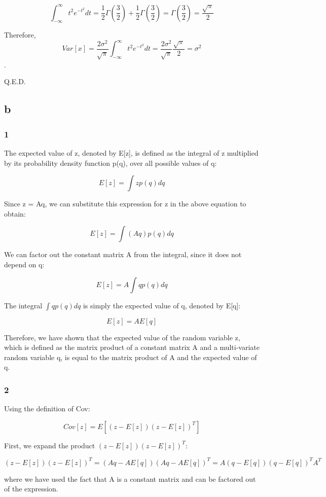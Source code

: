 $$\int_{-\infty}^{\infty} t^2 e^{-t^2} dt=\frac{1}{2}\Gamma\left(\frac{3}{2}\right)+\frac{1}{2}\Gamma\left(\frac{3}{2}\right)=\Gamma\left(\frac{3}{2}\right)=\frac{\sqrt{\pi}}{2}$$

Therefore,
$$Var[x] = \frac{2\sigma^2}{\sqrt{\pi}} \int_{-\infty}^{\infty} t^2 e^{-t^2} dt=\frac{2\sigma^2}{\sqrt{\pi}}\frac{\sqrt{\pi}}{2}=\sigma^2$$.

Q.E.D.

\subsection{b}
\subsubsection{1}

The expected value of z, denoted by E[z], is defined as the integral of z multiplied by its probability density function p(q), over all possible values of q:

$$E[z] = \int z p(q) dq  $$


Since z = Aq, we can substitute this expression for z in the above equation to obtain:

$$E[z] = \int (Aq) p(q) dq$$

We can factor out the constant matrix A from the integral, since it does not depend on q:

$$E[z] = A \int q p(q) dq $$

The integral $\int q p(q) dq$ is simply the expected value of q, denoted by E[q]:

$$E[z] = AE[q]$$

Therefore, we have shown that the expected value of the random variable z, which is defined as the matrix product of a constant matrix A and a multi-variate random variable q, is equal to the matrix product of A and the expected value of q.

\subsubsection{2}

Using the definition of Cov:

$$Cov[z] = E[(z - E[z])(z - E[z])^T]$$

First, we expand the product $(z - E[z])(z - E[z])^T$:

$$(z - E[z])(z - E[z])^T = (Aq - AE[q]) (Aq - AE[q])^T= A(q - E[q])(q - E[q])^T A^T$$

where we have used the fact that A is a constant matrix and can be factored out of the expression.

